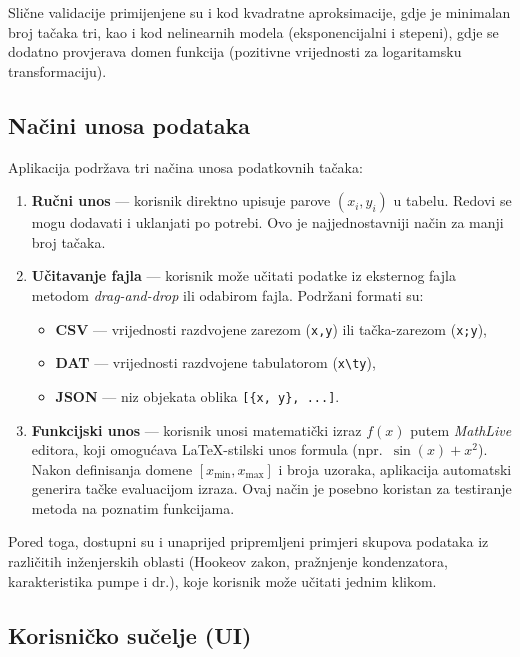 \documentclass[12pt, a4paper]{article}
\begin{document}
Slične validacije primijenjene su i kod kvadratne aproksimacije, gdje je
minimalan broj tačaka tri, kao i kod nelinearnih modela (eksponencijalni i
stepeni), gdje se dodatno provjerava domen funkcija (pozitivne vrijednosti
za logaritamsku transformaciju).

\subsection{Načini unosa podataka}

Aplikacija podržava tri načina unosa podatkovnih tačaka:

\begin{enumerate}
    \item \textbf{Ručni unos} --- korisnik direktno upisuje parove $(x_i, y_i)$
    u tabelu. Redovi se mogu dodavati i uklanjati po potrebi. Ovo je
    najjednostavniji način za manji broj tačaka.

    \item \textbf{Učitavanje fajla} --- korisnik može učitati podatke iz
    eksternog fajla metodom \textit{drag-and-drop} ili odabirom fajla.
    Podržani formati su:
    \begin{itemize}
        \item \textbf{CSV} --- vrijednosti razdvojene zarezom (\texttt{x,y})
        ili tačka-zarezom (\texttt{x;y}),
        \item \textbf{DAT} --- vrijednosti razdvojene tabulatorom (\texttt{x\textbackslash ty}),
        \item \textbf{JSON} --- niz objekata oblika \texttt{[\{x, y\}, ...]}.
    \end{itemize}

    \item \textbf{Funkcijski unos} --- korisnik unosi matematički izraz
    $f(x)$ putem \textit{MathLive} editora, koji omogućava LaTeX-stilski
    unos formula (npr.\ $\sin(x) + x^2$). Nakon definisanja domene
    $[x_{\min}, x_{\max}]$ i broja uzoraka, aplikacija automatski generira
    tačke evaluacijom izraza. Ovaj način je posebno koristan za testiranje
    metoda na poznatim funkcijama.
\end{enumerate}

Pored toga, dostupni su i unaprijed pripremljeni primjeri skupova podataka
iz različitih inženjerskih oblasti (Hookeov zakon, pražnjenje kondenzatora,
karakteristika pumpe i dr.), koje korisnik može učitati jednim klikom.

\newpage

\subsection{Korisničko sučelje (UI)}
\end{document}
